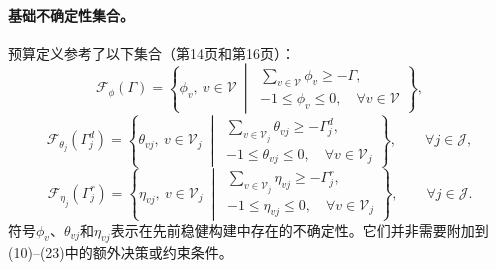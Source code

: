 \documentclass{article}
\begin{document}
\paragraph{基础不确定性集合。}
预算定义参考了以下集合（第14页和第16页）：
\[
\mathcal F_{\phi}(\Gamma)=
\left\{\phi_v,\ v\in\mathcal V\ \middle|\
\begin{array}{l}
\displaystyle\sum_{v\in\mathcal V}\phi_v\geq-\Gamma,\\
-1\leq\phi_v\leq0,\quad\forall v\in\mathcal V
\end{array}\right\},
\]
\[
\mathcal F_{\theta_j}(\Gamma^d_j)=
\left\{\theta_{vj},\ v\in\mathcal V_j\ \middle|\
\begin{array}{l}
\displaystyle\sum_{v\in\mathcal V_j}\theta_{vj}\geq-\Gamma^d_j,\\
-1\leq\theta_{vj}\leq0,\quad\forall v\in\mathcal V_j
\end{array}\right\},\qquad\forall j\in\mathcal J,
\]
\[
\mathcal F_{\eta_j}(\Gamma^r_j)=
\left\{\eta_{vj},\ v\in\mathcal V_j\ \middle|\
\begin{array}{l}
\displaystyle\sum_{v\in\mathcal V_j}\eta_{vj}\geq-\Gamma^r_j,\\
-1\leq\eta_{vj}\leq0,\quad\forall v\in\mathcal V_j
\end{array}\right\},\qquad\forall j\in\mathcal J.
\]
符号$\phi_v$、$\theta_{vj}$和$\eta_{vj}$表示在先前稳健构建中存在的不确定性。它们并非需要附加到(10)--(23)中的额外决策或约束条件。
\end{document}
